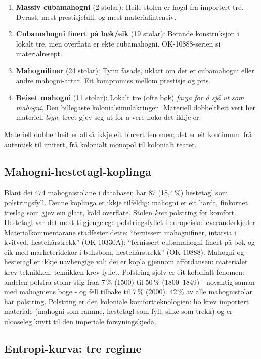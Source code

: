 \documentclass[10pt, a4paper, twocolumn]{article}
\begin{document}
\begin{enumerate}
  \item \textbf{Massiv cubamahogni} (2 stolar): Heile stolen er hogd frå importert tre. Dyrast, mest prestisjefull, og mest materialintensiv.
  \item \textbf{Cubamahogni finert på bøk/eik} (19 stolar): Berande konstruksjon i lokalt tre, men overflata er ekte cubamahogni. OK-10888-serien si materialresept.
  \item \textbf{Mahognifiner} (24 stolar): Tynn fasade, uklart om det er cubamahogni eller andre mahogni-artar. Eit kompromiss mellom prestisje og pris.
  \item \textbf{Beiset mahogni} (11 stolar): Lokalt tre (ofte bøk) \emph{farga for å sjå ut som mahogni}. Den billegaste kolonialsimulakringen. Materiell dobbeltheit vert her materiell \emph{løgn}: treet gjev seg ut for å vere noko det ikkje er.
\end{enumerate}

Materiell dobbeltheit er altså ikkje eit binært fenomen; det er eit kontinuum frå autentisk til imitert, frå kolonialt monopol til kolonialt teater.

\subsection{Mahogni-hestetagl-koplinga}

Blant dei 474 mahognistolane i databasen har 87 (18,4\,\%) hestetagl som polstringsfyll. Denne koplinga er ikkje tilfeldig: mahogni er eit hardt, finkornet treslag som gjev ein glatt, kald overflate. Stolen \emph{krev} polstring for komfort. Hestetagl var det mest tilgjengelege polstringsfyllet i europeiske leverandørkjeder. Materialkommentarane stadfester dette: ``fernissert mahognifiner, intarsia i kvitved, hestehårstrekk'' (OK-10330A); ``fernissert cubamahogni finert på bøk og eik med marketeridekor i buksbom, hestehårstrekk'' (OK-10888). Mahogni og hestetagl er ikkje uavhengige val; dei er kopla gjennom affordansen: materialet krev teknikken, teknikken krev fyllet. Polstring sjolv er eit kolonialt fenomen: andelen polstra stolar stig fraa 7\,\% (1500) til 50\,\% (1800--1849) - noyaktig saman med mahogniens boge - og fell tilbake til 7\,\% (2000). 42\,\% av alle mahognistolar har polstring. Polstring er den koloniale komfortteknologien: ho krev importert materiale (mahogni som ramme, hestetagl som fyll, silke som trekk) og er ulooseleg knytt til den imperiale forsyningskjeda.

\subsection{Entropi-kurva: tre regime}
\end{document}
